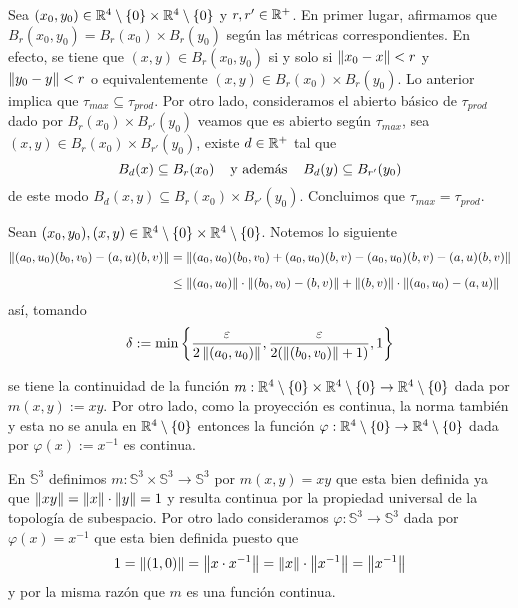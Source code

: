 \documentclass{article}
\begin{document}
\vspace{2mm}
\noindent Sea $(x_{0},y_{0})\in\mathbb{R}^{4}\setminus\{0\}\times\mathbb{R}^{4}\setminus\{0\}$ y $r,r'\in\mathbb{R}^{+}$. 
En primer lugar, afirmamos que $B_{r}(x_{0},y_{0})=B_{r}(x_{0})\times B_{r}(y_{0})$ según las 
métricas correspondientes. En efecto, se tiene que $(x,y)\in B_{r}(x_{0},y_{0})$ si y solo si 
$\left \lVert x_{0}-x\right \rVert<r$ y $\left \lVert y_{0}-y\right \rVert<r$ o equivalentemente $(x,y)\in B_{r}(x_{0})\times 
B_{r}(y_{0})$. Lo anterior implica que $\tau_{max}\subseteq\tau_{prod}$. Por otro lado, 
consideramos el abierto básico de $\tau_{prod}$ dado por $B_{r}(x_{0})\times B_{r'}(y_{0})$ veamos 
que es abierto según $\tau_{max}$, sea $(x,y)\in B_{r}(x_{0})\times B_{r'}(y_{0})$, existe 
$d\in\mathbb{R}^{+}$ tal que
\begin{equation*}
    B_{d}(x)\subseteq B_{r}(x_{0})
    \hspace{4mm}\text{y además}\hspace{4mm}
    B_{d}(y)\subseteq B_{r'}(y_{0})
\end{equation*}
de este modo $B_{d}(x,y)\subseteq B_{r}(x_{0})\times B_{r'}(y_{0})$. Concluimos que 
$\tau_{max}=\tau_{prod}$.

\vspace{2mm}
\noindent Sean $(x_{0},y_{0}),(x,y)\in\mathbb{R}^{4}\setminus\{0\}\times\mathbb{R}^{4}\setminus\{0\}$. Notemos lo 
siguiente
\begin{align*}
    \left \lVert (a_{0},u_{0})(b_{0},v_{0})-(a,u)(b,v)\right \rVert &= \left \lVert (a_{0},u_{0})(b_{0},v_{0})
    +(a_{0},u_{0})(b,v)-(a_{0},u_{0})(b,v)-(a,u)(b,v)\right \rVert \\[2mm]
    &\leq \left \lVert (a_{0},u_{0})\right \rVert\cdot\left \lVert (b_{0},v_{0})-(b,v)\right \rVert
    +\left \lVert (b,v)\right \rVert\cdot\left \lVert (a_{0},u_{0})-(a,u)\right \rVert
\end{align*}
así, tomando
\begin{equation*}
    \delta:=\min\left\{\frac{\varepsilon}{2\left \lVert (a_{0},u_{0})\right \rVert},
    \frac{\varepsilon}{2(\left \lVert (b_{0},v_{0})\right \rVert+1)},1\right\}
\end{equation*}

\vspace{2mm}
\noindent se tiene la continuidad de la función $m:\mathbb{R}^{4}\setminus\{0\}\times\mathbb{R}^{4}\setminus\{0\}
\to\mathbb{R}^{4}\setminus\{0\}$ dada por $m(x,y):=xy$. Por otro lado, como la proyección es continua, la
norma también y esta no se anula en $\mathbb{R}^{4}\setminus\{0\}$ entonces la función $\varphi:
\mathbb{R}^{4}\setminus\{0\}\to\mathbb{R}^{4}\setminus\{0\}$ dada por $\varphi(x):=x^{-1}$ es continua.

\vspace{2mm}
\noindent En $\mathbb{S}^{3}$ definimos $m:\mathbb{S}^{3}\times\mathbb{S}^{3}\to\mathbb{S}^{3}$
por $m(x,y)=xy$ que esta bien definida ya que $\left \lVert xy\right \rVert=\left \lVert x\right \rVert\cdot\left \lVert y\right \rVert=1$ y resulta 
continua por la propiedad universal de la topología de subespacio. Por otro lado consideramos 
$\varphi:\mathbb{S}^{3}\to\mathbb{S}^{3}$ dada por $\varphi(x)=x^{-1}$ que esta bien definida 
puesto que
\begin{equation*}
    1=\left \lVert (1,0)\right \rVert=\left \lVert x\cdot x^{-1}\right \rVert=\left \lVert x\right \rVert\cdot\left \lVert x^{-1}\right \rVert=\left \lVert x^{-1}\right \rVert
\end{equation*}
y por la misma razón que $m$ es una función continua.
\end{document}
